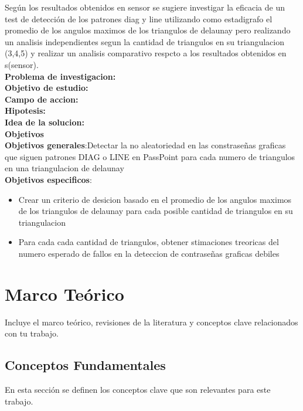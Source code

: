\documentclass[12pt]{report}
\begin{document}
	Según los resultados obtenidos en sensor se sugiere investigar la eficacia de un test de detección de los patrones diag y line utilizando como estadigrafo el promedio de los angulos maximos de los triangulos de delaunay pero realizando un analisis independientes segun la cantidad de triangulos en su triangulacion (3,4,5) y realizar un analisis comparativo respcto a los resultados obtenidos en s(sensor).\\
	
	\large{\textbf{Problema de investigacion:}}\\
	
	\large{\textbf{Objetivo de estudio:}}\\
	
	\large{\textbf{Campo de accion:}}\\
	
	\large{\textbf{Hipotesis:}}\\
	
	\large{\textbf{Idea de la solucion:}}\\
	
	\large{\textbf{Objetivos}}\\
	\normalsize{\textbf{Objetivos generales}}:Detectar\cite{1} la no aleatoriedad en las constraseñas graficas que siguen patrones DIAG o LINE en PassPoint para cada numero de triangulos en una triangulacion de delaunay\\
	\normalsize{\textbf{Objetivos especificos}}:
	\begin{itemize}
		\item Crear un criterio de desicion basado en el promedio de los angulos maximos de los triangulos de delaunay para cada posible cantidad de triangulos en su triangulacion
		\item  Para cada cada cantidad de triangulos, obtener stimaciones treoricas del numero esperado de fallos en la deteccion de contraseñas graficas debiles
	\end{itemize}
	
	
	

\setcounter{chapter}{0}
\chapter{Marco Teórico}
Incluye el marco teórico, revisiones de la literatura y conceptos clave relacionados con tu trabajo.
\section{Conceptos Fundamentales}
En esta sección se definen los conceptos clave que son relevantes para este trabajo. 
\end{document}
